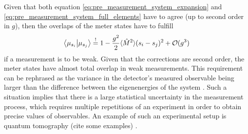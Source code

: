 \documentclass{article}
\newcommand\sj[1]{ {\color{orange} #1} }
\begin{document}
Given that both equation \eqref{eq:pre_measurement_system_expansion} and \eqref{eq:pre_measurement_system_full_elements} have to agree (up to second order in $g$), then the overlaps of the 
meter states have to fulfill
\begin{align}\label{eq:overlap_condition}
    \bra{\mu_{s_i}}\ket{\mu_{s_j}} \overset{!}{=} 1 - \frac{g^2}{2} \langle \hat{M}^2\rangle (s_i - s_j)^2 + \mathcal{O}(g^3)
\end{align}
if a measurement is to be weak. Given that the corrections are second order, the meter states have almost 
total overlap in weak measurements. This requirement can be rephrased as the variance in the detector's 
measured observable being larger than the difference between the eigenenergies of the system \cite{tamirWeakMeasurements2013}. 
Such a situation implies
that there is a large statistical uncertainty in the measurement process, which requires multiple repetitions of an experiment in order to obtain precise values of observables. An example of such an experimental setup is quantum tomography \sj{(cite some examples)}.
\end{document}
